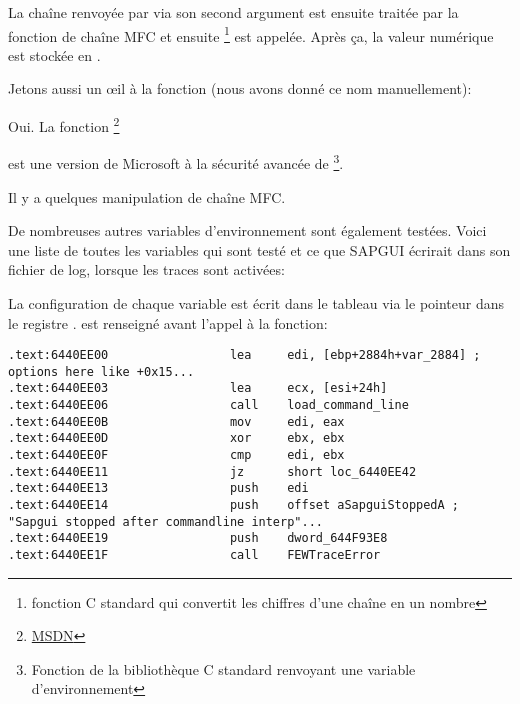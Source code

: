 


La chaîne renvoyée par  via son second argument est ensuite traitée
par la fonction de chaîne MFC et ensuite \footnote{fonction C standard
qui convertit les chiffres d'une chaîne en un nombre} est appelée.
Après ça, la valeur numérique est stockée en .

Jetons aussi un \oe{}il à la fonction  (nous avons donné ce nom manuellement):



Oui. La fonction \footnote{\href{http://go.yurichev.com/17250}{MSDN}}

est une version de Microsoft à la sécurité avancée de \footnote{Fonction
de la bibliothèque C standard renvoyant une variable d'environnement}.


Il y a quelques manipulation de chaîne MFC.

De nombreuses autres variables d'environnement sont également testées.
Voici une liste de toutes les variables qui sont testé et ce que SAPGUI écrirait
dans son fichier de log, lorsque les traces sont activées:



La configuration de chaque variable est écrit dans le tableau via le pointeur dans
le registre \EDI. \EDI est renseigné avant l'appel à la fonction:

\begin{lstlisting}[style=customasmx86]
.text:6440EE00                 lea     edi, [ebp+2884h+var_2884] ; options here like +0x15...
.text:6440EE03                 lea     ecx, [esi+24h]
.text:6440EE06                 call    load_command_line
.text:6440EE0B                 mov     edi, eax
.text:6440EE0D                 xor     ebx, ebx
.text:6440EE0F                 cmp     edi, ebx
.text:6440EE11                 jz      short loc_6440EE42
.text:6440EE13                 push    edi
.text:6440EE14                 push    offset aSapguiStoppedA ; "Sapgui stopped after commandline interp"...
.text:6440EE19                 push    dword_644F93E8
.text:6440EE1F                 call    FEWTraceError
\end{lstlisting}

